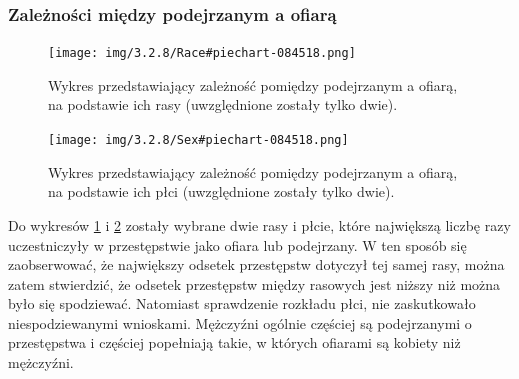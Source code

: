 \documentclass{classrep}
\begin{document}
{{            \subsubsection{Zależności między podejrzanym a ofiarą} {
                \begin{figure}[!htbp]
                    \centering
                    \texttt{[image: img/3.2.8/Race\#piechart-084518.png]}
                    \caption{Wykres przedstawiający zależność pomiędzy podejrzanym a ofiarą, na podstawie ich rasy (uwzględnione zostały tylko dwie).}
                    \label{pie_chart_race}
                \end{figure}
                \begin{figure}[!htbp]
                    \centering
                    \texttt{[image: img/3.2.8/Sex\#piechart-084518.png]}
                    \caption{Wykres przedstawiający zależność pomiędzy podejrzanym a ofiarą, na podstawie ich płci (uwzględnione zostały tylko dwie).}
                    \label{pie_chart_sex}
                \end{figure}
                \FloatBarrier
                
                Do wykresów \ref{pie_chart_race} i \ref{pie_chart_sex} zostały wybrane dwie rasy i płcie, które największą liczbę razy uczestniczyły w przestępstwie jako ofiara lub podejrzany. W ten sposób się zaobserwować, że największy odsetek przestępstw dotyczył tej samej rasy, można zatem stwierdzić, że odsetek przestępstw między rasowych jest niższy niż można było się spodziewać. Natomiast sprawdzenie rozkładu płci, nie zaskutkowało niespodziewanymi wnioskami. Mężczyźni ogólnie częściej są podejrzanymi o przestępstwa i częściej popełniają takie, w których ofiarami są kobiety niż mężczyźni.
            }
        }


    }
\end{document}
